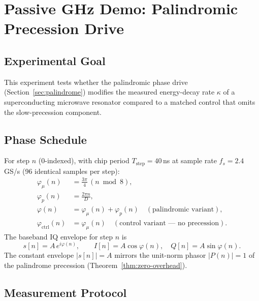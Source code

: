 \documentclass[12pt,a4paper]{article}
\theoremstyle{plain}
\theoremstyle{definition}
\theoremstyle{remark}
\begin{document}
\section{Passive GHz Demo: Palindromic Precession Drive}
\label{sec:passive-ghz}

\subsection{Experimental Goal}

This experiment tests whether the palindromic phase drive
(Section~\ref{sec:palindrome}) modifies the measured energy-decay rate
$\kappa$ of a superconducting microwave resonator compared to a matched
control that omits the slow-precession component.

\subsection{Phase Schedule}

For step $n$ (0-indexed), with chip period $T_{\mathrm{step}} = 40$\,ns at
sample rate $f_s = 2.4$\,GS/s (96 identical samples per step):
\begin{align}
  \varphi_\mu(n)    &= \tfrac{3\pi}{4}\,(n\bmod 8),
    \label{eq:ghz-fast}\\
  \varphi_p(n)      &= \tfrac{2\pi n}{D},
    \label{eq:ghz-slow}\\
  \varphi(n)        &= \varphi_\mu(n) + \varphi_p(n)
    \quad (\text{palindromic variant}),
    \label{eq:ghz-pal}\\
  \varphi_{\mathrm{ctrl}}(n) &= \varphi_\mu(n)
    \quad (\text{control variant — no precession}).
    \label{eq:ghz-ctrl}
\end{align}
The baseband IQ envelope for step $n$ is
\begin{equation}
  s[n] = A\,e^{i\varphi(n)},
  \qquad
  I[n] = A\cos\varphi(n),\quad
  Q[n] = A\sin\varphi(n).
  \label{eq:ghz-iq}
\end{equation}
The constant envelope $|s[n]| = A$ mirrors the unit-norm phasor
$|P(n)| = 1$ of the palindrome precession (Theorem~\ref{thm:zero-overhead}).

\subsection{Measurement Protocol}
\end{document}
